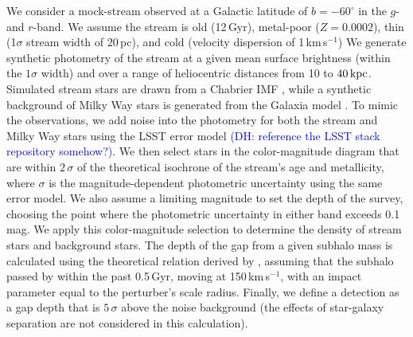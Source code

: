 \documentclass[modern,linenumbers]{aastex62}
\newcommand{\Comment}[3]{\textcolor{#1}{(#2: #3)}}
\newcommand{\DAH}[1]{\Comment{blue}{DH}{#1}} %
\begin{document}
We consider a mock-stream observed at a Galactic latitude of $b=-60^\circ$ in the $g$- and $r$-band. We assume the stream is old (12\,Gyr), metal-poor ($Z = 0.0002$), thin (1$\sigma$ stream width of 20\,pc), and cold (velocity dispersion of 1\,km\,s$^{-1}$) We generate synthetic photometry of the stream at a given mean surface brightness (within the $1\sigma$ width) and over a range of heliocentric distances from 10 to $40\mathrm{\,kpc}$.  Simulated stream stars are drawn from a Chabrier IMF \citep{2003PASP..115..763C}, while a synthetic background of Milky Way stars is generated from the Galaxia model \citep{sharma2011}. To mimic the observations, we add noise into the photometry for both the stream and Milky Way stars using the LSST error model \DAH{reference the LSST stack repository somehow?}. We then select stars in the color-magnitude diagram that are within $2\,\sigma$ of the theoretical isochrone of the stream's age and metallicity, where $\sigma$ is the magnitude-dependent photometric uncertainty using the same error model. 
We also assume a limiting magnitude to set the depth of the survey, choosing the point where the photometric uncertainty in either band exceeds 0.1 mag. We apply this color-magnitude selection to determine the density of stream stars and background stars.
The depth of the gap from a given subhalo mass is calculated using the theoretical relation derived by \citet{erkal2016}, assuming that the subhalo passed by within the past 0.5\,Gyr, moving at 150\,km\,s$^{-1}$, with an impact parameter equal to the perturber's scale radius. Finally, we define a detection as a gap depth that is $5\,\sigma$ above the noise background (the effects of star-galaxy separation are not considered in this calculation).
\end{document}
